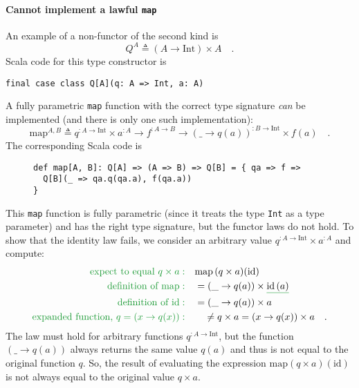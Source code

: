 \paragraph{Cannot implement a lawful \texttt{map}}

An example of a non-functor of the second kind is 
\[
Q^{A}\triangleq\left(A\rightarrow\text{Int}\right)\times A\quad.
\]
Scala code for this type constructor is
\begin{lstlisting}
final case class Q[A](q: A => Int, a: A)
\end{lstlisting}
A fully parametric \lstinline!map! function with the correct type
signature \emph{can} be implemented (and there is only one such implementation):
\[
\text{map}^{A,B}\triangleq q^{:A\rightarrow\text{Int}}\times a^{:A}\rightarrow f^{:A\rightarrow B}\rightarrow(\_\rightarrow q(a))^{:B\rightarrow\text{Int}}\times f(a)\quad.
\]
The corresponding Scala code is

\begin{wrapfigure}{l}{0.55\columnwidth}%
\vspace{-0.6\baselineskip}

\begin{lstlisting}
def map[A, B]: Q[A] => (A => B) => Q[B] = { qa => f =>
  Q[B](_ => qa.q(qa.a), f(qa.a)) 
}
\end{lstlisting}
\vspace{-0.8\baselineskip}
\end{wrapfigure}%

\noindent This \lstinline!map! function is fully parametric (since
it treats the type \lstinline!Int! as a type parameter) and has the
right type signature, but the functor laws do not hold. To show that
the identity law fails, we consider an arbitrary value $q^{:A\rightarrow\text{Int}}\times a^{:A}$
and compute:
\begin{align*}
{\color{greenunder}\text{expect to equal }q\times a:}\quad & \text{map}\,(q\times a)(\text{id})\\
{\color{greenunder}\text{definition of }\text{map}:}\quad & =(\_\rightarrow q(a))\times\gunderline{\text{id}\,(a)}\\
{\color{greenunder}\text{definition of }\text{id}:}\quad & =(\_\rightarrow q(a))\times a\\
{\color{greenunder}\text{expanded function, }q=\left(x\rightarrow q(x)\right):}\quad & \quad\neq q\times a=(x\rightarrow q(x))\times a\quad.
\end{align*}
The law must hold for arbitrary functions $q^{:A\rightarrow\text{Int}}$,
but the function $\left(\_\rightarrow q(a)\right)$ always returns
the same value $q(a)$ and thus is not equal to the original function
$q$. So, the result of evaluating the expression $\text{map}(q\times a)(\text{id})$
is not always equal to the original value $q\times a$. 

